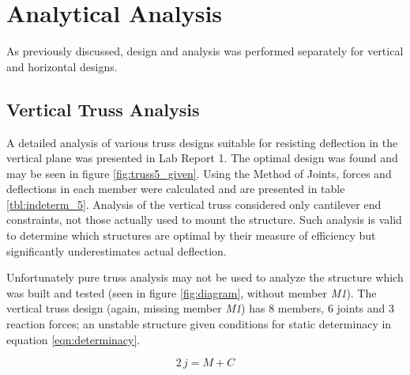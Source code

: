 \section{Analytical Analysis}

As previously discussed, design and analysis was performed separately for vertical and horizontal designs.

\subsection{Vertical Truss Analysis}

A detailed analysis of various truss designs suitable for resisting deflection in the vertical plane was presented in Lab Report 1. 
The optimal design was found and may be seen in figure \ref{fig:truss5_given}.
Using the Method of Joints, forces and deflections in each member were calculated and are presented in table \ref{tbl:indeterm_5}.
Analysis of the vertical truss considered only cantilever end constraints, not those actually used to mount the structure.
Such analysis is valid to determine which structures are optimal by their measure of efficiency but significantly underestimates actual deflection.

Unfortunately pure truss analysis may not be used to analyze the structure which was built and tested (seen in figure \ref{fig:diagram}, without member \emph{M1}).
The vertical truss design (again, missing member \emph{M1}) has 8 members, 6 joints and 3 reaction forces; an unstable structure given conditions for static determinacy in equation \ref{eqn:determinacy}.

\begin{equation}
	\label{eqn:determinacy}
	2\,j = M + C
\end{equation}



 

